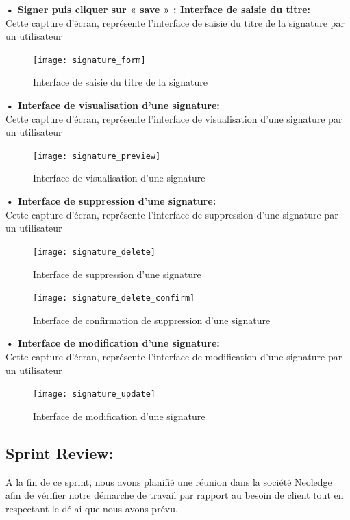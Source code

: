 \textbf{•	Signer puis cliquer sur « save » : Interface de saisie du titre:}\\
Cette capture d'écran, représente l'interface de saisie du titre de la signature par un utilisateur
\begin{figure}[H]
  \centering
  \texttt{[image: signature\_form]}
  \caption{Interface de saisie du titre de la signature}
  \label{fig:signature_title}
\end{figure}

\textbf{•	Interface de visualisation d'une signature:}\\
Cette capture d'écran, représente l'interface de visualisation d'une signature par un utilisateur

\begin{figure}[H]
  \centering
  \texttt{[image: signature\_preview]}
  \caption{Interface de visualisation d'une signature}
  \label{fig:signature_view}
\end{figure}

\textbf{•	Interface de suppression d'une signature:}\\
Cette capture d'écran, représente l'interface de suppression d'une signature par un utilisateur

\begin{figure}[h!]
  \centering
  \texttt{[image: signature\_delete]}
  \caption{Interface de suppression d'une signature}
  \label{fig:signature_delete}
\end{figure}
\begin{figure}[h!]
  \centering
  \texttt{[image: signature\_delete\_confirm]}
  \caption{Interface de confirmation de suppression d'une signature}
  \label{fig:signature_delete_confirm}
\end{figure}

\textbf{•	Interface de modification d'une signature:}\\
Cette capture d'écran, représente l'interface de modification d'une signature par un utilisateur
\begin{figure}[h!]
  \centering
  \texttt{[image: signature\_update]}
  \caption{Interface de modification d'une signature}
  \label{fig:signature_update}
\end{figure}



\subsection{Sprint Review:}
A la fin de ce sprint, nous avons planifié une réunion dans la société Neoledge afin de vérifier notre démarche de travail par rapport au besoin de client tout en respectant le délai que nous avons prévu.

